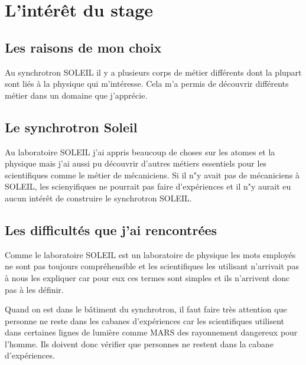 \chapter{L'intérêt du stage}
	\minitoc
	





\section{Les raisons de mon choix}
    Au synchrotron SOLEIL il y a plusieurs corps de métier différents dont la plupart sont liés à la physique qui m'intéresse. Cela m'a permis de découvrir différents métier dans un domaine que j'apprécie.
	
\section{Le synchrotron Soleil}
    Au laboratoire SOLEIL j'ai appris beaucoup de choses sur les atomes et la physique mais j'ai aussi pu découvrir d'autres métiers essentiels pour les scientifiques comme le métier de mécaniciens. Si il n"y avait pas de mécaniciens à SOLEIL, les scienyifiques ne pourrait pas faire d'expériences et il n"y aurait eu aucun intérêt de construire le synchrotron SOLEIL.

\section{Les difficultés que j'ai rencontrées}
    Comme le laboratoire SOLEIL est un laboratoire de physique les mots employés ne sont pas toujours compréhensible et les scientifiques les utilisant n'arrivait pas à nous les expliquer car pour eux ces termes sont simples et ils n'arrivent donc pas à les définir. 
    
    Quand on est dans le bâtiment du synchrotron, il faut faire très attention que personne ne reste dans les cabanes d'expériences car les scientifiques utilisent dans certaines lignes de lumière comme MARS des rayonnement dangereux pour l'homme. Ils doivent donc vérifier que personnes ne restent dans la cabane d'expériences.

%
%
